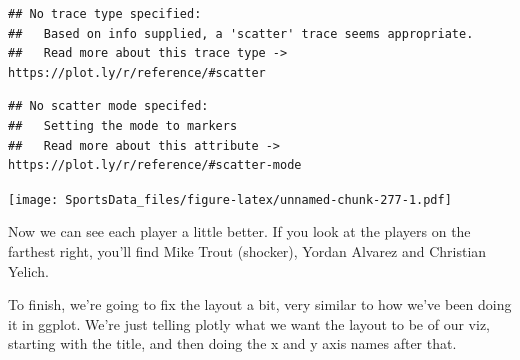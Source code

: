 \documentclass[]{book}
\newenvironment{Shaded}{\begin{snugshade}}{\end{snugshade}}
\newcommand{\DataTypeTok}[1]{\textcolor[rgb]{0.13,0.29,0.53}{#1}}
\newcommand{\KeywordTok}[1]{\textcolor[rgb]{0.13,0.29,0.53}{\textbf{#1}}}
\newcommand{\NormalTok}[1]{#1}
\newcommand{\OperatorTok}[1]{\textcolor[rgb]{0.81,0.36,0.00}{\textbf{#1}}}
\newcommand{\StringTok}[1]{\textcolor[rgb]{0.31,0.60,0.02}{#1}}
\begin{document}
\begin{verbatim}
## No trace type specified:
##   Based on info supplied, a 'scatter' trace seems appropriate.
##   Read more about this trace type -> https://plot.ly/r/reference/#scatter
\end{verbatim}

\begin{verbatim}
## No scatter mode specifed:
##   Setting the mode to markers
##   Read more about this attribute -> https://plot.ly/r/reference/#scatter-mode
\end{verbatim}

\texttt{[image: SportsData\_files/figure-latex/unnamed-chunk-277-1.pdf]}

Now we can see each player a little better. If you look at the players on the farthest right, you'll find Mike Trout (shocker), Yordan Alvarez and Christian Yelich.

To finish, we're going to fix the layout a bit, very similar to how we've been doing it in ggplot. We're just telling plotly what we want the layout to be of our viz, starting with the title, and then doing the x and y axis names after that.

\begin{Shaded}
\end{Shaded}
\end{document}
